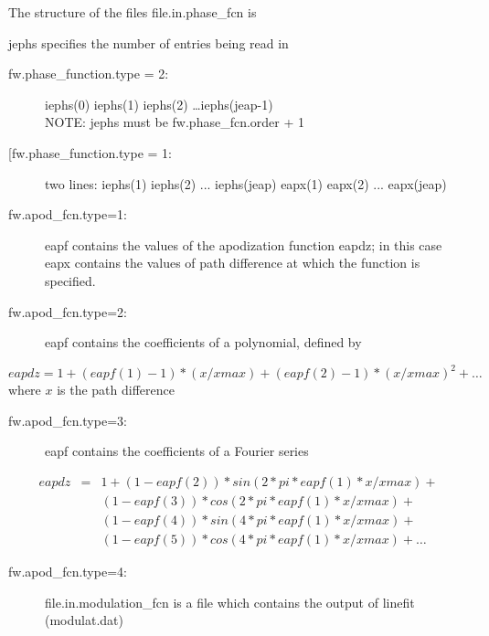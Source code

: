 \documentclass[a4paper]{article}
\begin{document}
The structure of the files file.in.phase\_fcn is

\vspace{1cm}
jephs specifies the number of entries being read in\\
\begin{description}
\item[fw.phase\_function.type = 2:] iephs(0) iephs(1) iephs(2) \ldots iephs(jeap-1)\\
  NOTE: jephs must be fw.phase\_fcn.order + 1
\item[[fw.phase\_function.type = 1:] two lines:
  iephs(1) iephs(2) ... iephs(jeap)
  eapx(1) eapx(2) ... eapx(jeap)\\
\end{description}

\begin{description}
\item [fw.apod\_fcn.type=1:] eapf contains the values of the apodization function eapdz; 
  in this case eapx contains the values of path difference at 
  which the function is specified.
\item[fw.apod\_fcn.type=2:] eapf contains the coefficients of a polynomial, defined
  by
\end{description}
\begin{equation}
  eapdz = 1 + (eapf(1)-1)*(x/xmax) + (eapf(2)-1)*(x/xmax)^2 + \ldots
\end{equation}
where $x$ is the path difference
\begin{description}
\item [fw.apod\_fcn.type=3:] eapf contains the coefficients of a Fourier series
\end{description}
\begin{eqnarray}
  eapdz &=& 1 + (1-eapf(2))*sin(2*pi*eapf(1)*x/xmax) +\\
        &&(1-eapf(3))*cos(2*pi*eapf(1)*x/xmax) +\\
        &&(1-eapf(4))*sin(4*pi*eapf(1)*x/xmax) +\\
        &&(1-eapf(5))*cos(4*pi*eapf(1)*x/xmax) +\ldots    
\end{eqnarray}
\begin{description}
\item [fw.apod\_fcn.type=4:] file.in.modulation\_fcn is a file which contains the output of linefit (modulat.dat)
\end{description}
\end{document}
